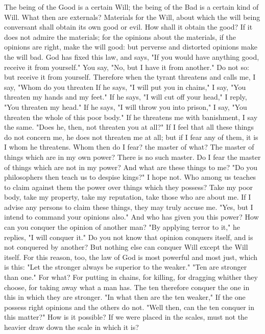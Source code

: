 \documentclass[a4paper]{article}
\begin{document}
    The being of the Good is a certain Will; the being of the Bad is a certain
kind of Will. What then are externals? Materials for the Will, about which the
will being conversant shall obtain its own good or evil. How shall it obtain
the good? If it does not admire the materials; for the opinions about the
materials, if the opinions are right, make the will good: but perverse and
distorted opinions make the will bad. God has fixed this law, and says, "If you
would have anything good, receive it from yourself." You say, "No, but I have
it from another." Do not so: but receive it from yourself. Therefore when the
tyrant threatens and calls me, I say, "Whom do you threaten If he says, "I will
put you in chains," I say, "You threaten my hands and my feet." If he says, "I
will cut off your head," I reply, "You threaten my head." If he says, "I will
throw you into prison," I say, "You threaten the whole of this poor body." If
he threatens me with banishment, I say the same. "Does he, then, not threaten
you at all?" If I feel that all these things do not concern me, he does not
threaten me at all; but if I fear any of them, it is I whom he threatens. Whom
then do I fear? the master of what? The master of things which are in my own
power? There is no such master. Do I fear the master of things which are not in
my power? And what are these things to me?
    "Do you philosophers then teach us to despise kings?" I hope not. Who among
us teaches to claim against them the power over things which they possess? Take
my poor body, take my property, take my reputation, take those who are about
me. If I advise any persons to claim these things, they may truly accuse me.
"Yes, but I intend to command your opinions also." And who has given you this
power? How can you conquer the opinion of another man? "By applying terror to
it," he replies, "I will conquer it." Do you not know that opinion conquers
itself, and is not conquered by another? But nothing else can conquer Will
except the Will itself. For this reason, too, the law of God is most powerful
and most just, which is this: "Let the stronger always be superior to the
weaker." "Ten are stronger than one." For what? For putting in chains, for
killing, for dragging whither they choose, for taking away what a man has. The
ten therefore conquer the one in this in which they are stronger. "In what then
are the ten weaker," If the one possess right opinions and the others do not.
"Well then, can the ten conquer in this matter?" How is it possible? If we were
placed in the scales, must not the heavier draw down the scale in which it is?
\end{document}
